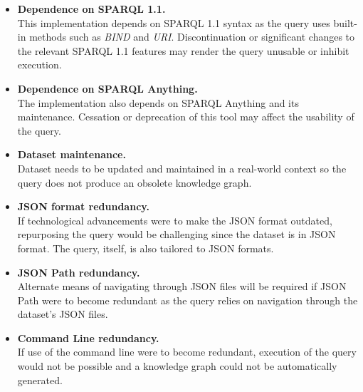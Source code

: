 \begin{itemize}
    \item \textbf{Dependence on SPARQL 1.1.} \\ This implementation depends on SPARQL 1.1 syntax as the query uses built-in methods such as \textit{BIND} and \textit{URI}. Discontinuation or significant changes to the relevant SPARQL 1.1 features may render the query unusable or inhibit execution.
    \item \textbf{Dependence on SPARQL Anything.} \\ The implementation also depends on SPARQL Anything and its maintenance. Cessation or deprecation of this tool may affect the usability of the query. 
    \item \textbf{Dataset maintenance.} \\ Dataset needs to be updated and maintained in a real-world context so the query does not produce an obsolete knowledge graph. 
    \item \textbf{JSON format redundancy.} \\ If technological advancements were to make the JSON format outdated, repurposing the query would be challenging since the dataset is in JSON format. The query, itself, is also tailored to JSON formats.
    \item \textbf{JSON Path redundancy.} \\ Alternate means of navigating through JSON files will be required if JSON Path were to become redundant as the query relies on navigation through the dataset's JSON files.
    \item \textbf{Command Line redundancy.} \\ If use of the command line were to become redundant, execution of the query would not be possible and a knowledge graph could not be automatically generated. 
\end{itemize}

